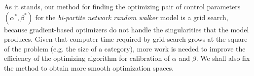 As it stands, our method for finding the optimizing pair of control parameters $(\alpha^*,\beta^*)$ for the {\it bi-partite network random walker} model is a grid search, because gradient-based optimizers do not handle the singularities that the model produces. Given that computer time required by grid-search grows at the square of the problem (e.g. the size of a category), more work is needed to improve the efficiency of the optimizing algorithm for calibration of $\alpha$ and $\beta$. We shall also fix the method to obtain more smooth optimization spaces.



